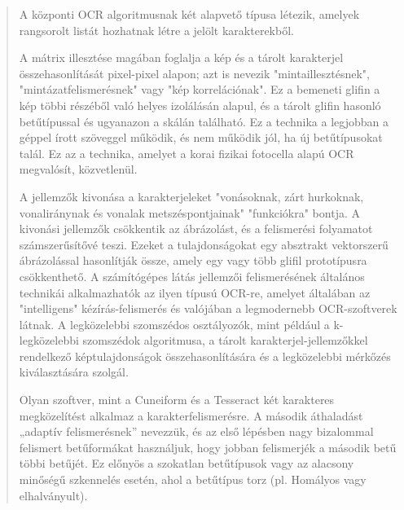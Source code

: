 \cite{bradski2000opencv}
\begin{quotation}
	A központi OCR algoritmusnak két alapvető típusa létezik, amelyek rangsorolt listát hozhatnak létre a jelölt karakterekből.
	
	A mátrix illesztése magában foglalja a kép és a tárolt karakterjel összehasonlítását pixel-pixel alapon; azt is nevezik "mintaillesztésnek", "mintázatfelismerésnek" vagy "kép korrelációnak". Ez a bemeneti glifin a kép többi részéből való helyes izolálásán alapul, és a tárolt glifin hasonló betűtípussal és ugyanazon a skálán található. Ez a technika a legjobban a géppel írott szöveggel működik, és nem működik jól, ha új betűtípusokat talál. Ez az a technika, amelyet a korai fizikai fotocella alapú OCR megvalósít, közvetlenül.
	
	A jellemzők kivonása a karakterjeleket "vonásoknak, zárt hurkoknak, vonaliránynak és vonalak metszéspontjainak" "funkciókra" bontja. A kivonási jellemzők csökkentik az ábrázolást, és a felismerési folyamatot számszerűsítővé teszi. Ezeket a tulajdonságokat egy absztrakt vektorszerű ábrázolással hasonlítják össze, amely egy vagy több glifil prototípusra csökkenthető. A számítógépes látás jellemzői felismerésének általános technikái alkalmazhatók az ilyen típusú OCR-re, amelyet általában az "intelligens" kézírás-felismerés és valójában a legmodernebb OCR-szoftverek látnak. A legközelebbi szomszédos osztályozók, mint például a k-legközelebbi szomszédok algoritmusa, a tárolt karakterjel-jellemzőkkel rendelkező képtulajdonságok összehasonlítására és a legközelebbi mérkőzés kiválasztására szolgál.
	
	Olyan szoftver, mint a Cuneiform és a Tesseract két karakteres megközelítést alkalmaz a karakterfelismerésre. A második áthaladást „adaptív felismerésnek” nevezzük, és az első lépésben nagy bizalommal felismert betűformákat használjuk, hogy jobban felismerjék a második betű többi betűjét. Ez előnyös a szokatlan betűtípusok vagy az alacsony minőségű szkennelés esetén, ahol a betűtípus torz (pl. Homályos vagy elhalványult).
\end{quotation}
